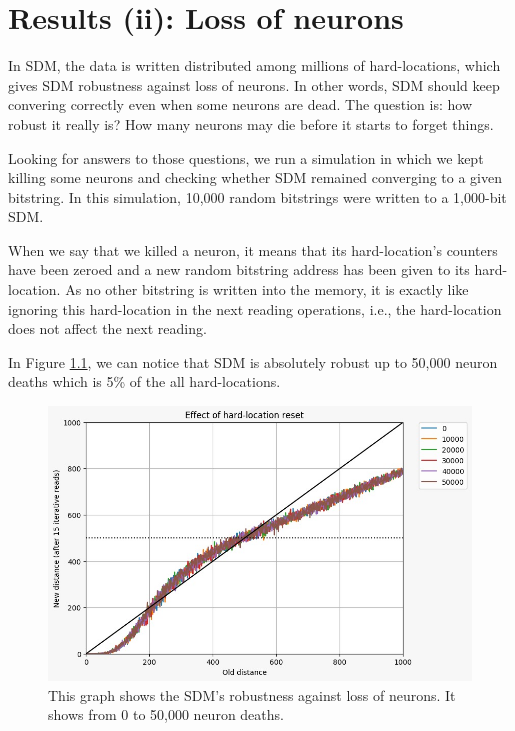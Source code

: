 \chapter{Results (ii): Loss of neurons}

In SDM, the data is written distributed among millions of hard-locations, which gives SDM robustness against loss of neurons. In other words, SDM should keep convering correctly even when some neurons are dead. The question is: how robust it really is? How many neurons may die before it starts to forget things.

Looking for answers to those questions, we run a simulation in which we kept killing some neurons and checking whether SDM remained converging to a given bitstring. In this simulation, 10,000 random bitstrings were written to a 1,000-bit SDM.

When we say that we killed a neuron, it means that its hard-location's counters have been zeroed and a new random bitstring address has been given to its hard-location. As no other bitstring is written into the memory, it is exactly like ignoring this hard-location in the next reading operations, i.e., the hard-location does not affect the next reading.

In Figure \ref{fig:sdm-neuron-death-50k}, we can notice that SDM is absolutely robust up to 50,000 neuron deaths which is 5\% of the all hard-locations.

\begin{figure}[h]
\centering\includegraphics[width=\textwidth]{./images02/new-images/sdm-neuron-death-50k.png}
\caption{This graph shows the SDM's robustness against loss of neurons. It shows from 0 to 50,000 neuron deaths.
\label{fig:sdm-neuron-death-50k}}
\end{figure}

